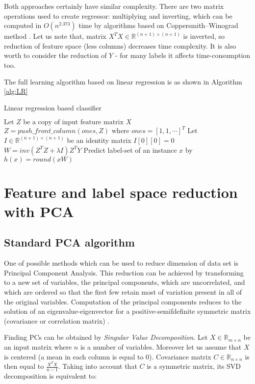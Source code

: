 Both approaches certainly have similar complexity. There are two matrix operations used to create regressor: multiplying and inverting, which can be computed in $O(n^{2.373})$ time by algorithms based on Coppersmith–Winograd method \cite{VVW}. Let us note that, matrix $X^TX \in \mathbb{R}^{(n+1) \times (n+1)}$ is inverted, so reduction of feature space (less columns) decreases time complexity. It is also worth to consider the reduction of $Y$ - for many labels it affects time-consumption too.   

The full learning algorithm based on linear regression is as shown in Algorithm \ref{alg:LR} 

\begin{algorithm}
    \caption{Linear regression based classifier}\label{alg:LR}
    \begin{algorithmic}[1]
    \State $\text{Let } Z \text{ be a copy of input feature matrix } X$
    \State $Z=push\_front\_column(ones, Z) \text{ where } ones=[1, 1, \cdots]^T$
    \State Let $I \in \mathbb{R}^{(n+1) \times (n+1)}$ be an identity matrix
    \State $I[0][0] = 0$
    \State $W=inv(Z^TZ+\lambda I)Z^TY$
    \State Predict label-set of an instance $x$ by $h(x)=round(xW)$ 
    \end{algorithmic}
\end{algorithm}


\section{Feature and label space reduction with PCA}

\subsection{Standard PCA algorithm}

One of possible methods which can be used to reduce dimension of data set is Principal Component Analysis. This reduction can be achieved by transforming to a new set of variables, the principal components, which are uncorrelated, and which are ordered so that the first few retain most of variation present in all of the original variables. Computation of the principal components reduces to the solution of an eigenvalue-eigenvector for a positive-semifdefinite symmetric matrix (covariance or correlation matrix) \cite{Jolliffe}.

Finding PCs can be obtained by \textit{Singular Value Decomposition}. Let $X \in \mathbb{R}_{m \times n}$ be an input matrix where $n$ is a number of variables. Moreover let us assume that $X$ is centered (a mean in each column is equal to $0$). Covariance matrix $C \in \mathbb{R}_{n \times n}$ is then equal to $\frac{X^TX}{n-1}$. Taking into account that $C$ is a symmetric matrix, its SVD decomposition is equivalent to:

